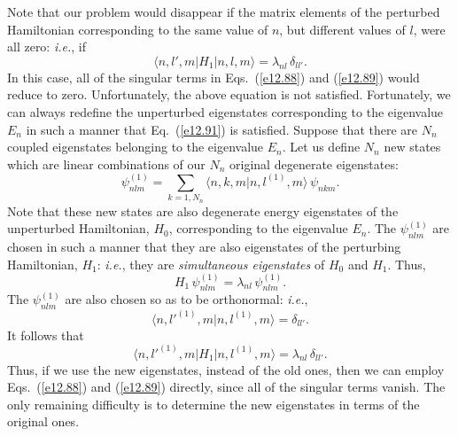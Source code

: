 Note that our problem would disappear if the matrix elements of the
perturbed Hamiltonian corresponding to the same value of $n$, but
different values of $l$, were all zero: {\em i.e.}, if
\begin{equation}\label{e12.91}
\langle n,l',m|H_1|n,l,m\rangle = \lambda_{nl}\,\delta_{ll'}.
\end{equation}
In this case, all of the singular
terms in Eqs.~(\ref{e12.88}) and (\ref{e12.89}) would reduce to zero.
Unfortunately, the above equation is not satisfied. Fortunately, we can
always redefine the unperturbed eigenstates corresponding to the
eigenvalue $E_n$ in such a manner that Eq.~(\ref{e12.91}) is satisfied.
Suppose that there are $N_n$ coupled eigenstates belonging
to the eigenvalue $E_n$. Let us define $N_n$ new states
which are linear combinations of our $N_n$ original degenerate eigenstates:
\begin{equation}
\psi_{nlm}^{(1)}= \sum_{k=1,N_n}\langle n,k,m|n,l^{(1)},m\rangle\,\psi_{nkm}.
\end{equation}
Note that these new states are also degenerate energy eigenstates of the
unperturbed Hamiltonian, $H_0$,  corresponding to the eigenvalue $E_n$. The
$\psi_{nlm}^{(1)}$ are chosen in such a manner that they are also
eigenstates of the  perturbing Hamiltonian, $H_1$:
{\em i.e.}, they are {\em simultaneous eigenstates}\/ of $H_0$ and $H_1$. Thus,
\begin{equation}\label{e12.93}
H_1\,\psi_{nlm}^{(1)} = \lambda_{nl}\,\psi_{nlm}^{(1)}.
\end{equation}
The $\psi_{nlm}^{(1)}$ are also chosen so as to be orthonormal:
{\em i.e.},
\begin{equation}
\langle n,l'^{(1)},m|n,l^{(1)},m\rangle = \delta_{ll'}.
\end{equation}
It follows that
\begin{equation}
\langle n,l'^{(1)},m|H_1|n,l^{(1)},m\rangle =\lambda_{nl}\, \delta_{ll'}.
\end{equation}
Thus, if we use the new eigenstates, instead of the old ones, then we
can employ Eqs.~(\ref{e12.88}) and (\ref{e12.89}) directly, since all
of the singular terms vanish. The only remaining difficulty
is to determine the new eigenstates in terms of the original ones.

